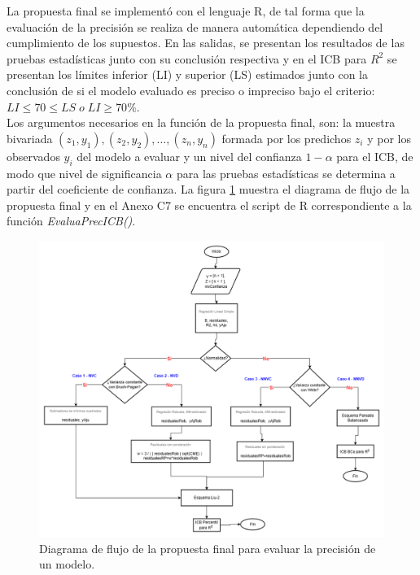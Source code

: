 La propuesta final se implementó con el lenguaje R, de tal forma que la evaluación de la precisión se realiza de manera automática dependiendo del cumplimiento de los supuestos. En las salidas, se presentan los resultados de las pruebas estadísticas junto con su conclusión respectiva y en el ICB para $R^2$ se presentan los límites inferior (LI) y superior (LS) estimados junto con la conclusión de si el modelo evaluado es preciso o impreciso bajo el criterio: $LI \leq  70  \leq LS \; o \; LI \geq 70\%$.\\



Los argumentos necesarios en la función de la propuesta final, son: la muestra bivariada $(z_1, y_1), (z_2, y_2), \dots, (z_n, y_n)$ formada por los predichos $z_i$ y por los observados $y_i$ del modelo a evaluar y un nivel del confianza $1-\alpha$ para el ICB, de modo que nivel de significancia $\alpha$ para las pruebas estadísticas se determina a partir del coeficiente de confianza. La figura \ref{fig:propuestaFinal}  muestra el diagrama de flujo de la propuesta final y en el Anexo C7 se encuentra el script de R correspondiente a la función \textit{EvaluaPrecICB()}.

\begin{figure}[ht!]
	\centering 
	\includegraphics[width=0.94\linewidth]{img/propuestaFinalv7.png} 
	\caption{Diagrama de flujo de la propuesta final para evaluar la precisión de un modelo.}
	\label{fig:propuestaFinal}
\end{figure}
\FloatBarrier

